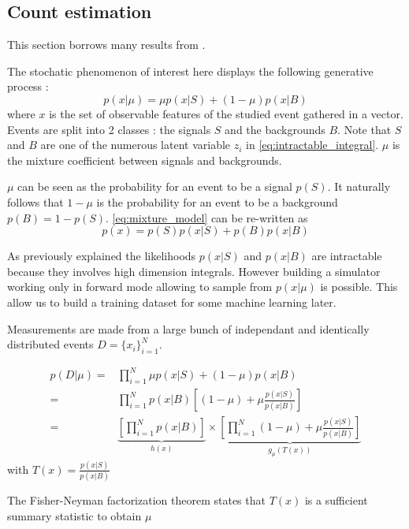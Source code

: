 \subsection{Count estimation} %
\label{sub:count_estimation}


This section borrows many results from \cite{Neal:2007zz}.

The stochatic phenomenon of interest here displays the following generative process :
\begin{equation}
	\label{eq:mixture_model}
	p(x|\mu) = \mu p(x|S) + (1-\mu) p(x|B)
\end{equation}
where $x$ is the set of observable features of the studied event gathered in a vector.
Events are split into 2 classes : the signals $S$ and the backgrounds $B$.
Note that $S$ and $B$ are one of the numerous latent variable $z_i$ in \autoref{eq:intractable_integral}.
$\mu$ is the mixture coefficient between signals and backgrounds.

$\mu$ can be seen as the probability for an event to be a signal $p(S)$. 
It naturally follows that $1-\mu$ is the probability for an event to be a background $p(B)=1-p(S)$.
\autoref{eq:mixture_model} can be re-written as
\begin{equation}
	p(x) = p(S)p(x|S) + p(B)p(x|B)
\end{equation}

As previously explained the likelihoods $p(x|S)$ and $p(x|B)$ are intractable because they involves high dimension integrals.
However building a simulator working only in forward mode allowing to sample from $p(x|\mu)$ is possible.
This allow us to build a training dataset for some machine learning later.

Measurements are made from a large bunch of independant and identically distributed events $D=\{x_i\}_{i=1}^N$.

\begin{align*}
	p(D|\mu) =& \prod_{i=1}^N \mu p(x|S) + (1-\mu) p(x|B) \\
	       =& \prod_{i=1}^N p(x|B) \left [(1-\mu) + \mu \frac{p(x|S)}{p(x|B)} \right ]\\
\label{eq:Fisher-Neyman}
	       =& \underbrace{\left[ \prod_{i=1}^N p(x|B) \right ]}_{h(x)} \times 
	       \underbrace{\left [\prod_{i=1}^N (1-\mu) + \mu \frac{p(x|S)}{p(x|B)} \right ]}_{g_\mu(T(x))}
\end{align*}
with $T(x) = \frac{p(x|S)}{p(x|B)} $

The Fisher-Neyman factorization theorem \needcite states that $T(x)$ is a sufficient summary statistic to obtain $\mu$

